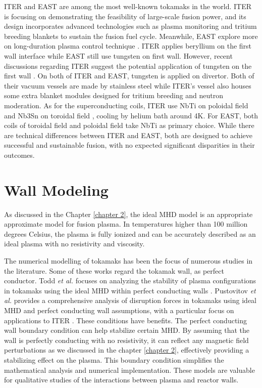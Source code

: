 ITER \cite{pong2012worldwide} and EAST \cite{wan2005progress} are among the most well-known tokamaks in the world. ITER is focusing on demonstrating the feasibility of large-scale fusion power, and its design incorporates advanced technologies such as plasma monitoring and tritium breeding blankets to sustain the fusion fuel cycle. Meanwhile, EAST explore more on long-duration plasma control technique \cite{wan2005progress}. ITER applies beryllium on the first wall interface while EAST still use tungsten on first wall. However, recent discussions regarding ITER suggest the potential application of tungsten on the first wall \cite{iter_website}. On both of ITER and EAST, tungsten is applied on divertor. Both of their vacuum vessels are made by stainless steel while ITER's vessel also houses some extra blanket modules designed for tritium breeding and neutron moderation. As for the superconducting coils, ITER use NbTi on poloidal field and Nb3Sn on toroidal field \cite{pong2012worldwide}, cooling by helium bath around 4K. For EAST, both coils of toroidal field and poloidal field take NbTi as primary choice. While there are technical differences between ITER and EAST, both are designed to achieve successful and sustainable fusion, with no expected significant disparities in their outcomes.

\section{Wall Modeling}
As discussed in the Chapter \ref{chapter 2}, the ideal MHD model is an appropriate approximate model for fusion plasma. In temperatures higher than 100 million degrees Celsius, the plasma is fully ionized and can be accurately described as an ideal plasma with no resistivity and viscosity.

The numerical modelling of tokamaks has been the focus of numerous studies in the literature. Some of these works regard the tokamak wall, as perfect conductor. Todd \textit{et al.} focuses on analyzing the stability of plasma configurations in tokamaks using the ideal MHD within perfect conducting walls \cite{todd1979dependence}. Pustovitov \textit{et al.} provides a comprehensive analysis of disruption forces in tokamaks using ideal MHD and perfect conducting wall assumptions, with a particular focus on applications to ITER \cite{pustovitov2017computation}. These conditions have benefits. The perfect conducting wall boundary condition can help stabilize certain MHD. By assuming that the wall is perfectly conducting with no resistivity, it can reflect any magnetic field perturbations as we discussed in the chapter \ref{chapter 2}, effectively providing a stabilizing effect on the plasma. This boundary condition simplifies the mathematical analysis and numerical implementation. These models are valuable for qualitative studies of the interactions between plasma and reactor walls.

